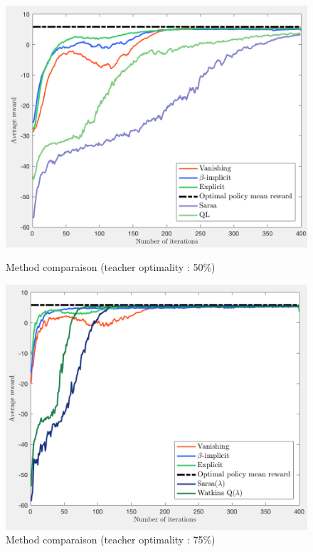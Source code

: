 \documentclass[a4paper]{report}
\begin{document}
{{{				\begin{figure}[ht!]
					\begin{minipage}{0.5\linewidth}
						\includegraphics[width=\linewidth]{loner_comp_50}
						\caption{Method comparaison (teacher optimality : 50\%)}
						\label{fig::loner_comp_50}
					\end{minipage}
					\begin{minipage}{0.5\linewidth}
						\includegraphics[width=\linewidth]{loner_comp_120}
						\caption{Method comparaison (teacher optimality : 75\%)}
						\label{fig::loner_comp_120}
					\end{minipage}
				\end{figure}
				
}}}
\end{document}
